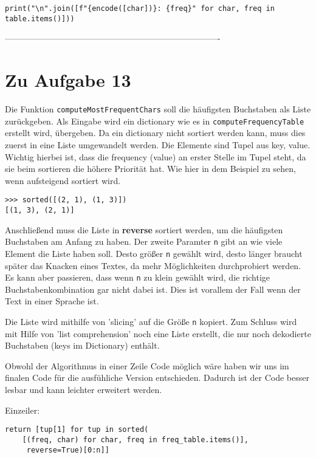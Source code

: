 \documentclass[12pt]{article}
\begin{document}
\begin{lstlisting}
print("\n".join([f"{encode([char])}: {freq}" for char, freq in table.items()]))
\end{lstlisting}

%
 ----------------------------------------------------------------------------
\section{Zu Aufgabe 13}

Die Funktion \texttt{computeMostFrequentChars} soll die häufigsten Buchstaben als Liste zurückgeben. Als Eingabe wird ein dictionary wie es in \texttt{computeFrequencyTable} erstellt wird, übergeben. Da ein dictionary nicht sortiert werden kann, muss dies zuerst in eine Liste umgewandelt werden. Die Elemente sind Tupel aus key, value. Wichtig hierbei ist, dass die frequency (value) an erster Stelle im Tupel steht, da sie beim sortieren die höhere Priorität hat. Wie hier in dem Beispiel zu sehen, wenn aufsteigend sortiert wird.

\begin{lstlisting}
>>> sorted([(2, 1), (1, 3)])
[(1, 3), (2, 1)]     
\end{lstlisting}

Anschließend muss die Liste in \textbf{reverse} sortiert werden, um die häufigsten Buchstaben am Anfang zu haben. Der zweite Paramter \texttt{n} gibt an wie viele Element die Liste haben soll. Desto größer \texttt{n} gewählt wird, desto länger braucht später das Knacken eines Textes, da mehr Möglichkeiten durchprobiert werden. Es kann aber passieren, dass wenn \texttt{n} zu klein gewählt wird, die richtige Buchstabenkombination gar nicht dabei ist. Dies ist vorallem der Fall wenn der Text in einer Sprache ist. 

Die Liste wird mithilfe von 'slicing' auf die Größe \texttt{n} kopiert. Zum Schluss wird mit Hilfe von 'list comprehension' noch eine Liste erstellt, die nur noch dekodierte Buchstaben (keys im Dictionary) enthält.

Obwohl der Algorithmus in einer Zeile Code möglich wäre haben wir uns im finalen Code für die ausfühliche Version entschieden. Dadurch ist der Code besser lesbar und kann leichter erweitert werden. 

Einzeiler:
\begin{lstlisting}
return [tup[1] for tup in sorted(
	[(freq, char) for char, freq in freq_table.items()],
	 reverse=True)[0:n]] 
\end{lstlisting}
\end{document}
